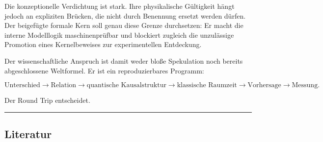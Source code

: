 \documentclass[
  11pt,
  a4paper,
]{article}
\begin{document}
Die konzeptionelle Verdichtung ist stark. Ihre physikalische Gültigkeit
hängt jedoch an expliziten Brücken, die nicht durch Benennung ersetzt
werden dürfen. Der beigefügte formale Kern soll genau diese Grenze
durchsetzen: Er macht die interne Modelllogik maschinenprüfbar und
blockiert zugleich die unzulässige Promotion eines Kernelbeweises zur
experimentellen Entdeckung.

Der wissenschaftliche Anspruch ist damit weder bloße Spekulation noch
bereits abgeschlossene Weltformel. Er ist ein reproduzierbares Programm:

\[
\text{Unterschied}
\rightarrow
\text{Relation}
\rightarrow
\text{quantische Kausalstruktur}
\rightarrow
\text{klassische Raumzeit}
\rightarrow
\text{Vorhersage}
\rightarrow
\text{Messung}.
\]

Der Round Trip entscheidet.

\begin{center}\rule{0.5\linewidth}{0.5pt}\end{center}

\subsection{Literatur}\label{literatur}
\end{document}

